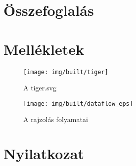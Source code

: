 \documentclass[12pt]{report}
\theoremstyle{definition}
\begin{document}

    \chapter{Összefoglalás}



    \nocite{Foley:1990:CGP:83821}
    {}
    



    \chapter*{Mellékletek}


  \begin{figure}[!htb]
  \begin{center}
    \texttt{[image: img/built/tiger]}
  \end{center}
    \caption{\label{tiger} A tiger.svg}
  \end{figure}

  \begin{figure}[!htb]
  \begin{center}
    \texttt{[image: img/built/dataflow\_eps]}
  \end{center}
    \caption{\label{dataflow} A rajzolás folyamatai}
  \end{figure}



    \chapter*{Nyilatkozat}
\end{document}
